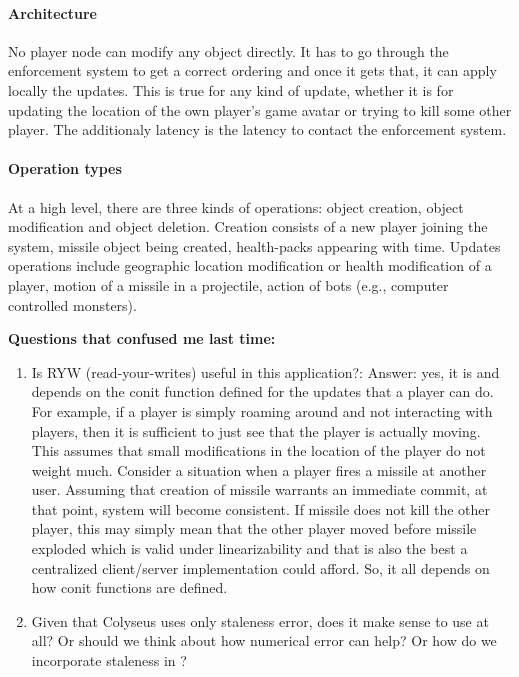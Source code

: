 \documentclass[twocolumn,10pt]{article}
\begin{document}
{\paragraph{Architecture} No player node can modify any object directly. It has to go through the enforcement system to get a correct ordering and once it gets that, it can apply locally the updates. This is true for any kind of update, whether it is for updating the location of the own player's game avatar or trying to kill some other player. The additionaly latency is the latency to contact the enforcement system. 

\paragraph{Operation types} At a high level, there are three kinds of operations: object creation, object modification and object deletion. Creation consists of a new player joining the system, missile object being created, health-packs appearing with time. Updates operations include geographic location modification or health modification of a player, motion of a missile in a projectile, action of bots (e.g., computer controlled monsters).




\textbf{Questions that confused me last time:}
\begin{enumerate}
\item{Is RYW (read-your-writes) useful in this application?:} Answer: yes, it is and depends on the conit function defined for the updates that a player can do. For example, if a player is simply roaming around and not interacting with players, then it is sufficient to just see that the player is actually moving. This assumes that small modifications in the location of the player do not weight much. Consider a situation when a player fires a missile at another user. Assuming that creation of missile warrants an immediate commit, at that point, system will become consistent. If missile does not kill the other player, this may simply mean that the other player moved before missile exploded which is valid under linearizability and that is also the best a centralized client/server implementation could afford. So, it all depends on how conit functions are defined.
\item{} Given that Colyseus uses only staleness error, does it make sense to use \Sys at all? Or should
we think about how numerical error can help? Or how do we incorporate staleness in \Sys?
\end{enumerate}

}
\end{document}
